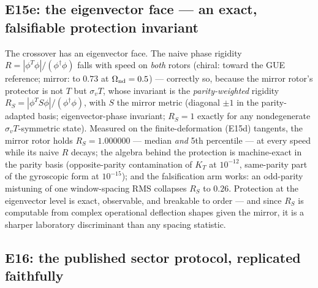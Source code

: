 \documentclass[11pt]{article}
\begin{document}
\subsection{E15e: the eigenvector face --- an exact, falsifiable
protection invariant}
\label{sec:e15e}

The crossover has an eigenvector face. The naive phase rigidity
$R=|\phi^{T}\phi|/(\phi^{\dagger}\phi)$ falls with speed on \emph{both}
rotors (chiral: toward the GUE reference; mirror: to $0.73$ at
$\Omega_{\rm nd}=0.5$) --- correctly so, because the mirror rotor's
protector is not $T$ but $\sigma_vT$, whose invariant is the
\emph{parity-weighted} rigidity
$R_S=|\phi^{T}S\phi|/(\phi^{\dagger}\phi)$, with $S$ the mirror metric
(diagonal $\pm1$ in the parity-adapted basis; eigenvector-phase
invariant; $R_S=1$ exactly for any nondegenerate
$\sigma_vT$-symmetric state). Measured on the finite-deformation
(E15d) tangents, the mirror rotor holds $R_S=1.000000$ --- median
\emph{and} 5th percentile --- at every speed while its naive $R$
decays; the algebra behind the protection is machine-exact in the
parity basis (opposite-parity contamination of $K_T$ at $10^{-12}$,
same-parity part of the gyroscopic form at $10^{-15}$); and the
falsification arm works: an odd-parity mistuning of one window-spacing
RMS collapses $R_S$ to $0.26$. Protection at the eigenvector level is
exact, observable, and breakable to order --- and since $R_S$ is
computable from complex operational deflection shapes given the mirror,
it is a sharper laboratory discriminant than any spacing statistic.

\subsection{E16: the published sector protocol, replicated faithfully}
\label{sec:e16}
\end{document}
